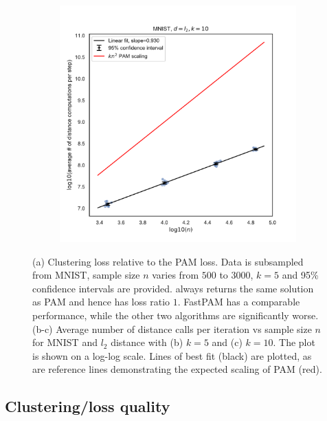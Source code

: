 \begin{figure}[ht]
\begin{subfigure}{.3\textwidth}
      \caption{}
    \end{subfigure}
    \begin{subfigure}{.3\textwidth}
      \centering
      \includegraphics[width=\linewidth]{figures/MNIST-L2-k10.pdf}   
      \caption{}
    \end{subfigure}
    \caption{(a) Clustering loss relative to the PAM loss. Data is subsampled from MNIST, sample size $n$ varies from $500$ to $3000$, $k = 5$ and 95\% confidence intervals are provided. \algname always returns the same solution as PAM and hence has loss ratio $1$. FastPAM has a comparable performance, while the other two algorithms are significantly worse. 
    (b-c) Average number of distance calls per iteration vs sample size $n$ for MNIST and $l_2$ distance with (b) $k=5$ and (c) $k=10$. The plot is shown on a log-log scale. Lines of best fit (black) are plotted, as are reference lines demonstrating the expected scaling of PAM (red).}
    \label{fig:mods}
\end{figure}

\subsection{Clustering/loss quality \label{subsec:loss}}

